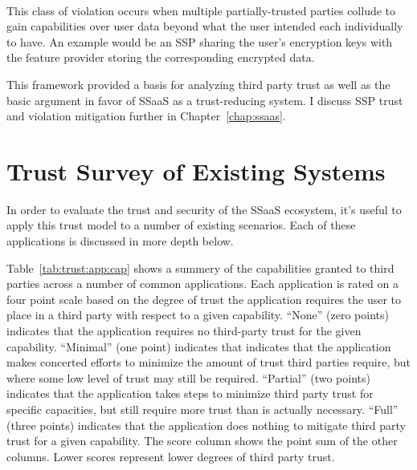 \begin{packed_desc}
\item[Colluding (L):] \hfill \\ This class of violation occurs when
  multiple partially-trusted parties collude to gain capabilities over
  user data beyond what the user intended each individually to
  have. An example would be an SSP sharing the user's encryption keys
  with the feature provider storing the corresponding encrypted data.
\end{packed_desc}

This framework provided a basis for analyzing third party trust as
well as the basic argument in favor of SSaaS as a trust-reducing
system. I discuss SSP trust and violation mitigation further in
Chapter~\ref{chap:ssaas}.

\section{Trust Survey of Existing Systems}
\label{chap:trust:survey}

In order to evaluate the trust and security of the SSaaS ecosystem,
it's useful to apply this trust model to a number of existing
scenarios. Each of these applications is discussed in more depth
below.

Table~\ref{tab:trust:app:cap} shows a summery of the capabilities
granted to third parties across a number of common applications. Each
application is rated on a four point scale based on the degree of
trust the application requires the user to place in a third party with
respect to a given capability. ``None'' (zero points) indicates that
the application requires no third-party trust for the given
capability. ``Minimal'' (one point) indicates that indicates that the
application makes concerted efforts to minimize the amount of trust
third parties require, but where some low level of trust may still be
required. ``Partial'' (two points) indicates that the application
takes steps to minimize third party trust for specific capacities, but
still require more trust than is actually necessary. ``Full'' (three
points) indicates that the application does nothing to mitigate third
party trust for a given capability. The score column shows the point
sum of the other columns. Lower scores represent lower degrees of
third party trust.

